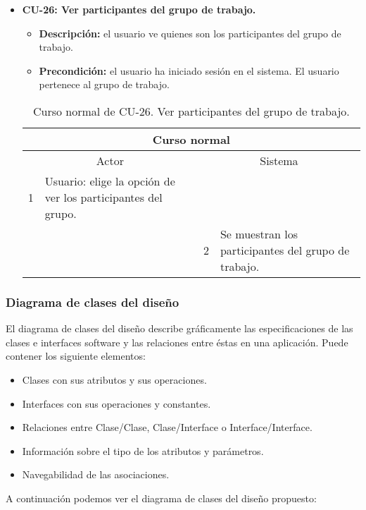 \begin{itemize}
	\item \textbf{CU-26: Ver participantes del grupo de trabajo.}
	\begin{itemize}
		\item \textbf{Descripción:} el usuario ve quienes son los participantes del grupo de trabajo.
		\item \textbf{Precondición:} el usuario ha iniciado sesión en el sistema. El usuario pertenece al grupo de trabajo.
	\end{itemize}
	\begin{table}[H]
		\centering
		\begin{tabular}{|p{0.3cm}|p{5cm}|p{0.3cm}|p{5cm}|}
			\hline
			\multicolumn{4}{|c|}{Curso normal} \\ \hline
			\multicolumn{2}{|c|}{Actor} & \multicolumn{2}{|c|}{Sistema} \\ \hline
			1 & Usuario: elige la opción de ver los participantes del grupo. &  &  \\ \hline
			&  & 2 & Se muestran los participantes del grupo de trabajo. \\ \hline
		\end{tabular}
		\caption{Curso normal de CU-26. Ver participantes del grupo de trabajo.}
		\label{tabla:cu26-normal}
	\end{table}
\end{itemize}

\subsubsection{Diagrama de clases del diseño}
El diagrama de clases del diseño describe gráficamente las especificaciones de las clases e interfaces software y las relaciones entre éstas en una aplicación. Puede contener los siguiente elementos:
\begin{itemize}
	\item Clases con sus atributos y sus operaciones.
	\item Interfaces con sus operaciones y constantes.
	\item Relaciones entre Clase/Clase, Clase/Interface o Interface/Interface.
	\item Información sobre el tipo de los atributos y parámetros.
	\item Navegabilidad de las asociaciones.
\end{itemize}

A continuación podemos ver el diagrama de clases del diseño propuesto:

